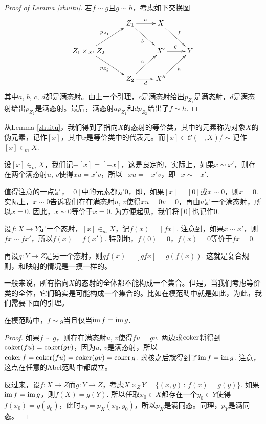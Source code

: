 \begin{proof}[Proof of Lemma \ref{zhuitu}]
	若$f\sim g$且$g\sim h$，考虑如下交换图
	\[
	\xymatrix{
	&Z_1\ar[r]^a\ar[rd]_b&X\ar[rd]^f&\\
	Z_1\times_{X'} Z_2\ar[ru]^{p_{Z_1}}\ar[rd]_{p_{Z_2}}&&X'\ar[r]^g&Y\\
	&Z_2\ar[ru]^c\ar[r]_d&X''\ar[ru]_h&
	}
	\]
	其中$a$, $b$, $c$, $d$都是满态射。由上一个引理，$c$是满态射给出$p_{Z_1}$是满态射，$d$是满态射给出$p_{Z_2}$是满态射。最后，满态射$ap_{Z_1}$和$dp_{Z_2}$给出了$f\sim h$.
\end{proof}

\begin{para}
从Lemma \ref{zhuitu}，我们得到了指向$X$的态射的等价类，其中的元素称为对象$X$的伪元素，记作$[x]$，其中$x$是等价类中的代表元。而$[x]\in \mathcal{C}(-,X)/\sim$记作$[x]\in_m X$. 

设$[x]\in_m X$，我们记$-[x]=[-x]$，这是良定的，实际上，如果$x\sim x'$，则存在两个满态射$u$, $v$使得$xu=x'v$，所以$-xu=-x'v$，即$-x\sim -x'$. 

值得注意的一点是，$[0]$中的元素都是$0$，即，如果$[x]=[0]$或$x\sim 0$，则$x=0$. 实际上，$x\sim 0$告诉我们存在满态射$u$, $v$使得$xu=0v=0$，再由$u$是一个满态射，所以$x=0$. 因此，$x\sim 0$等价于$x=0$. 为方便起见，我们将$[0]$也记作$0$.

设$f:X\to Y$是一个态射，$[x]\in_m X$，记$f(x)=[fx]$. 注意到，如果$x\sim x'$，则$fx\sim fx'$，所以$f(x)=f(x')$. 特别地，$f(0)=0$，$f(x)=0$等价于$fx=0$.

再设$g:Y\to Z$是另一个态射，则$gf(x)=[gfx]=g(f(x))$. 这就是复合规则，和映射的情况是一摸一样的。
\end{para}

一般来说，所有指向$X$的态射的全体都不能构成一个集合。但是，当我们考虑等价类的全体，它们确实是可能构成一个集合的。比如在模范畴中就是如此，为此，我们需要下面的引理。

\begin{lem}
在模范畴中，$f\sim g$当且仅当$\operatorname{im} f = \operatorname{im} g$.
\end{lem}

\begin{proof}
如果$f\sim g$，则存在满态射$u$, $v$使得$fu=gv$. 两边求$\operatorname{coker}$将得到$\operatorname{coker}(fu)=\operatorname{coker}(gv)$，因为$u$, $v$是满态射，所以$\operatorname{coker} f=\operatorname{coker}(fu)=\operatorname{coker}(gv)=\operatorname{coker} g$. 求核之后就得到了$\operatorname{im} f=\operatorname{im} g$. 注意，这点在任意的Abel范畴中都成立。

反过来，设$f:X\to Z$而$g:Y\to Z$，考虑$X\times_Z Y=\{(x,y)\,:\,f(x)=g(y)\}$. 如果$\operatorname{im} f=\operatorname{im} g$，则$f(X)=g(Y)$. 所以任取$x_0\in X$都存在一个$y_0\in Y$使得$f(x_0)=g(y_0)$，此时$x_0=p_X(x_0,y_0)$，所以$p_X$是满同态。同理，$p_Y$是满同态。
\end{proof}

